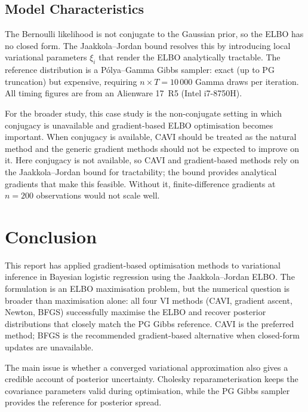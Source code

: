 \documentclass[11pt,a4paper]{article}
\begin{document}
\subsection{Model Characteristics}

The Bernoulli likelihood is not conjugate to the Gaussian prior, so the ELBO
has no closed form. The Jaakkola--Jordan bound resolves this by introducing
local variational parameters $\xi_i$ that render the ELBO analytically tractable.
The reference distribution is a P\'{o}lya--Gamma Gibbs sampler: exact (up to
PG truncation) but expensive, requiring $n \times T = 10\,000$ Gamma draws per
iteration. All timing figures are from an Alienware 17~R5 (Intel i7-8750H).

For the broader study, this case study is the non-conjugate setting in which
conjugacy is unavailable and gradient-based ELBO optimisation becomes important.
When conjugacy is available, CAVI should be treated as the natural method and the
generic gradient methods should not be expected to improve on it. Here conjugacy
is not available, so CAVI and gradient-based methods rely on the Jaakkola--Jordan
bound for tractability; the bound provides analytical gradients that make this
feasible. Without it, finite-difference gradients at $n=200$ observations would
not scale well.

\section*{Conclusion}

This report has applied gradient-based optimisation methods to variational inference
in Bayesian logistic regression using the Jaakkola--Jordan ELBO. The formulation
is an ELBO maximisation problem, but the numerical question is broader than
maximisation alone: all four VI methods (CAVI, gradient ascent, Newton, BFGS)
successfully maximise the ELBO and recover posterior distributions that closely
match the PG Gibbs reference. CAVI is the preferred method; BFGS is the
recommended gradient-based alternative when closed-form updates are unavailable.

The main issue is whether a converged variational approximation also gives a
credible account of posterior uncertainty. Cholesky reparameterisation keeps the
covariance parameters valid during optimisation, while the PG Gibbs sampler
provides the reference for posterior spread.
\end{document}
